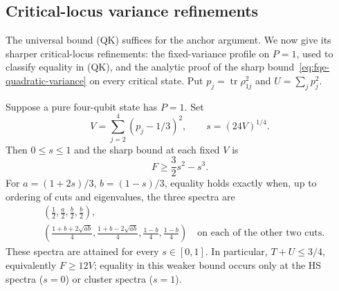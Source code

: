 \subsection{Critical-locus variance refinements}\label{sec:fqe-renyi-compatibility}
The universal bound (QK) suffices for the anchor argument. We now give its sharper
critical-locus refinements: the fixed-variance profile on $P=1$, used to classify equality
in (QK), and the analytic proof of the sharp bound~\eqref{eq:fqe-quadratic-variance} on every critical state.
Put $p_j=\operatorname{tr}\rho_{1j}^2$ and $U=\sum_jp_j^2$.

\begin{proposition}
\label{prop:fqe-critical-variance}
Suppose a pure four-qubit state has $P=1$. Set
\[
V=\sum_{j=2}^4(p_j-1/3)^2,\qquad s=(24V)^{1/4}.
\]
Then $0\le s\le1$ and the sharp bound at each fixed $V$ is
\[
\boxed{\quad F\ge\frac32s^2-s^3.\quad}
\tag{RF}\label{eq:fqe-critical-variance}
\]
For $a=(1+2s)/3$, $b=(1-s)/3$, equality holds exactly when, up to ordering of
cuts and eigenvalues, the three spectra are
\[
\begin{split}
&\left(\frac12,\frac a2,\frac b2,\frac b2\right),\\
&\left(\frac{1+b+2\sqrt{ab}}4,\frac{1+b-2\sqrt{ab}}4,
\frac{1-b}4,\frac{1-b}4\right)\quad\text{on each of the other two cuts}.
\end{split}
\tag{RF-eq}\label{eq:fqe-variance-spectra}
\]
These spectra are attained for every $s\in[0,1]$.
In particular, $T+U\le3/4$, equivalently $F\ge12V$; equality in this weaker
bound occurs only at the HS spectra ($s=0$) or cluster spectra ($s=1$).
\end{proposition}
\noindent[Proved under the hypothesis $P=1$.]
